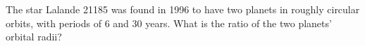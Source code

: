         The star Lalande 21185 was found in 1996 to have two planets in roughly
        circular orbits, with periods of 6 and 30 years. What is the ratio of the
        two planets' orbital radii?\answercheck
